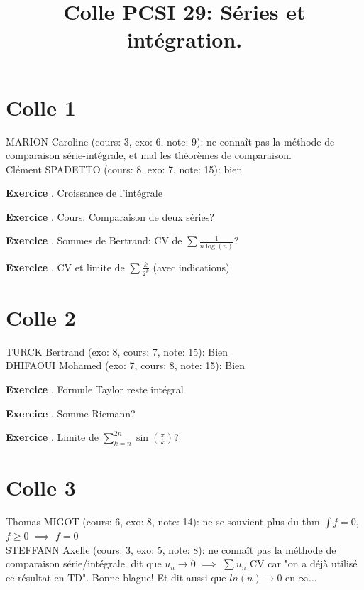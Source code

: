 \documentclass[10pt,a4paper]{article}
\title{Colle PCSI 29: Séries et intégration.}
\newcounter{question}
\newcounter{exo}
\newenvironment{exo}{\vspace{0.5cm}\setcounter{question}{0}\addtocounter{exo}{1} \noindent \textbf{Exercice \theexo}. \normalsize }{\par}
\begin{document}
	\maketitle
	
	\section*{Colle 1}
	\setcounter{exo}{0}
	MARION Caroline (cours: 3, exo: 6, note: 9): ne connaît pas la méthode de comparaison série-intégrale, et mal les théorèmes de comparaison.\\
	Clément SPADETTO (cours: 8, exo: 7, note: 15): bien\\
	
	\begin{exo}
		 Croissance de l'intégrale
	\end{exo}

	\begin{exo}
		Cours: Comparaison de deux séries?
	\end{exo}

	\begin{exo}
		Sommes de Bertrand: CV de $\sum \frac{1}{n \log(n)}$?
	\end{exo}	
	
	\begin{exo}
		CV et limite de $\sum{\frac{k}{2^k}}$ (avec indications)
	\end{exo}
	
	\section*{Colle 2}
	\setcounter{exo}{0}
	TURCK Bertrand (exo: 8, cours: 7, note: 15): Bien\\
	DHIFAOUI Mohamed (exo: 7, cours: 8, note: 15): Bien\\
	
	\begin{exo}
			Formule Taylor reste intégral
	\end{exo}		
	
	\begin{exo}
		Somme Riemann?
	\end{exo}		
	
	\begin{exo}
		Limite de $\sum_{k=n}^{2n} \sin(\frac{\pi}{k})$?
	\end{exo}

	\section*{Colle 3}
	\setcounter{exo}{0}
	Thomas MIGOT (cours: 6, exo: 8, note: 14): ne se souvient plus du thm $\int f = 0$, $f \geq 0$ $\implies$ $f = 0$\\
	STEFFANN Axelle (cours: 3, exo: 5, note: 8): ne connaît pas la méthode de comparaison série/intégrale. dit que $u_n \longrightarrow 0$ $\implies$ $\sum u_n$ CV car "on a déjà utilisé ce résultat en TD". Bonne blague! Et dit aussi que $ln(n) \longrightarrow 0$ en $\infty$... \\
	
\end{document}
